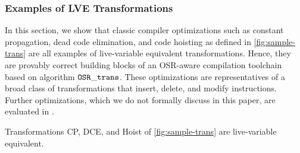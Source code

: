 \subsubsection{Examples of LVE Transformations}

\label{ss:lve-trans}

In this section, we show that classic compiler optimizations such as constant propagation, dead code elimination, and code hoisting as defined in \myfigure\ref{fig:sample-trans} are all examples of live-variable equivalent transformations. Hence, they are provably correct building blocks of an OSR-aware compilation toolchain based on algorithm $\text{${\tt OSR\_trans}$}$. These optimizations are representatives of a broad class of transformations that insert, delete, and modify instructions. Further optimizations, which we do not formally discuss in this paper, are evaluated in \missing.

\begin{theorem}
\label{th:lve-trans-examples}
Transformations CP, DCE, and Hoist of \myfigure\ref{fig:sample-trans} are live-variable equivalent.
\end{theorem}

